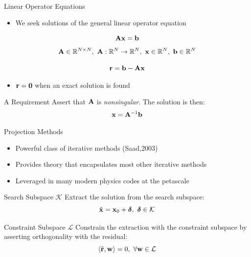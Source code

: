 \documentclass{beamer}
\begin{document}
\begin{frame}{Linear Operator Equations}

  \begin{itemize}
  \item We seek solutions of the general linear operator equation
  \end{itemize}

  \[
  \mathbf{A} \mathbf{x} = \mathbf{b}
  \]
  \[
  \mathbf{A} \in \mathbb{R}^{N \times N},\ \mathbf{A} : \mathbb{R}^{N}
  \rightarrow \mathbb{R}^{N},\ \mathbf{x} \in \mathbb{R}^N,\ \mathbf{b} \in
  \mathbb{R}^N
  \]


  \[
  \mathbf{r} = \mathbf{b} - \mathbf{A}\mathbf{x}
  \]

  \begin{itemize}
  \item $\mathbf{r}=\mathbf{0}$ when an exact solution is found
  \end{itemize}

  \begin{beamerboxesrounded}[upper=boxheadcolor,lower=boxbodycolor,shadow=true]
    {A Requirement} Assert that $\mathbf{A}$ is \textit{nonsingular}. The
    solution is then:
    \[
    \mathbf{x} = \mathbf{A}^{-1}\mathbf{b}
    \]
  \end{beamerboxesrounded}

\end{frame}

\begin{frame}{Projection Methods}

  \begin{itemize}
  \item Powerful class of iterative methods (Saad,2003)
  \item Provides theory that encapsulates most other iterative methods
  \item Leveraged in many modern physics codes at the petascale
  \end{itemize}

  \begin{beamerboxesrounded}[upper=boxheadcolor,lower=boxbodycolor,shadow=true]
    {Search Subspace $\mathcal{K}$} Extract the solution from the
    search subspace:
    \[
    \tilde{\mathbf{x}} = \mathbf{x}_0 +
    \boldsymbol{\delta},\ \boldsymbol{\delta} \in \mathcal{K}
    \]
  \end{beamerboxesrounded}

  \begin{beamerboxesrounded}[upper=boxheadcolor,lower=boxbodycolor,shadow=true]
    {Constraint Subspace $\mathcal{L}$} Constrain the extraction with
    the constraint subspace by asserting orthogonality with the
    residual:
    \[
    \langle \tilde{\mathbf{r}},\mathbf{w} \rangle = 0,\ \forall \mathbf{w} \in
    \mathcal{L}
    \]  
  \end{beamerboxesrounded}

\end{frame}
\end{document}
